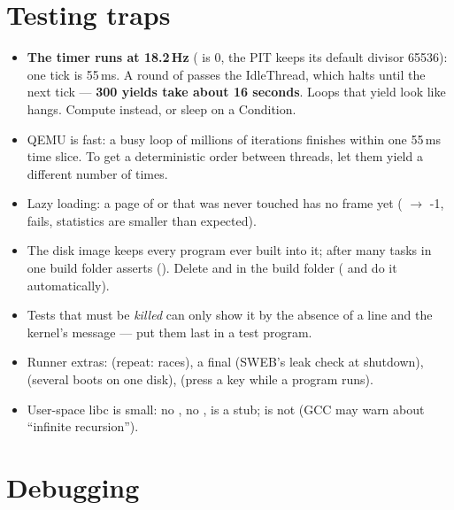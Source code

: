 \section{Testing traps}
\label{sec:testing}

\begin{itemize}
\item \textbf{The timer runs at 18.2\,Hz} ( is 0, the PIT keeps its
  default divisor 65536): one tick is 55\,ms. A round of  passes the IdleThread,
  which halts until the next tick --- \textbf{300 yields take about 16 seconds}. Loops that yield
  look like hangs. Compute instead, or sleep on a Condition.
\item QEMU is fast: a busy loop of millions of iterations finishes within one 55\,ms time slice.
  To get a deterministic order between threads, let them yield a different number of times.
\item Lazy loading: a page of  or  that was never touched has no frame yet
  ( $\to$ -1,  fails, statistics are smaller than expected).
\item The disk image keeps every program ever built into it; after many tasks in one build folder
   asserts (). Delete  and 
  in the build folder ( and  do it automatically).
\item Tests that must be \emph{killed} can only show it by the absence of a \code{[FAIL]} line and the
  kernel's message --- put them last in a test program.
\item Runner extras:  (repeat: races), a final  (SWEB's leak check at shutdown),
   (several boots on one disk), 
  (press a key while a program runs).
\item User-space libc is small: no , no ,  is a stub;
   is not  (GCC may warn about ``infinite recursion'').
\end{itemize}

\section{Debugging}

